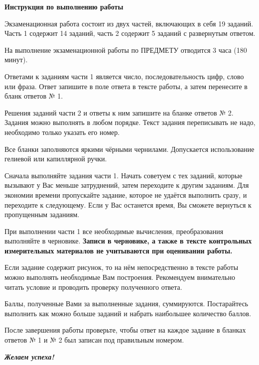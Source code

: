 \documentclass{../../libre-oge}
\author{CSharpKun \& PositiveCHEEK}
\date{2026}
\begin{document}
\begin{center}
	\textbf{\large Инструкция по выполнению работы}
\end{center}


Экзаменационная работа состоит из двух частей, включающих в себя
19 заданий. Часть 1 содержит 14 заданий, часть 2 содержит 5 заданий с развернутым ответом.

На выполнение экзаменационной работы по ПРЕДМЕТУ отводится
3 часа (180 минут).

Ответами к заданиям части 1 является число,
последовательность цифр, слово или фраза. Ответ запишите в поле ответа в тексте работы,
а затем перенесите в бланк ответов № 1.

Решения заданий части 2 и ответы к ним запишите на бланке
ответов № 2. Задания можно выполнять в любом порядке. Текст задания
переписывать не надо, необходимо только указать его номер.

Все бланки заполняются яркими чёрными чернилами. Допускается
использование гелиевой или капиллярной ручки.

Сначала выполняйте задания части 1. Начать советуем с тех заданий,
которые вызывают у Вас меньше затруднений, затем переходите к другим
заданиям. Для экономии времени пропускайте задание, которое не удаётся
выполнить сразу, и переходите к следующему. Если у Вас останется время,
Вы сможете вернуться к пропущенным заданиям.

При выполнении части 1 все необходимые вычисления,
преобразования выполняйте в черновике. \textbf{Записи в черновике, а также
в тексте контрольных измерительных материалов не учитываются при
оценивании работы.}

Если задание содержит рисунок, то на нём непосредственно в тексте
работы можно выполнять необходимые Вам построения. Рекомендуем
внимательно читать условие и проводить проверку полученного ответа.

Баллы, полученные Вами за выполненные задания, суммируются.
Постарайтесь выполнить как можно больше заданий и набрать наибольшее
количество баллов.

После завершения работы проверьте, чтобы ответ на каждое задание
в бланках ответов № 1 и № 2 был записан под правильным номером.

\medskip

\begin{center}
	\textit{\textbf{Желаем успеха!}} 
\end{center}

\newpage
\end{document}

